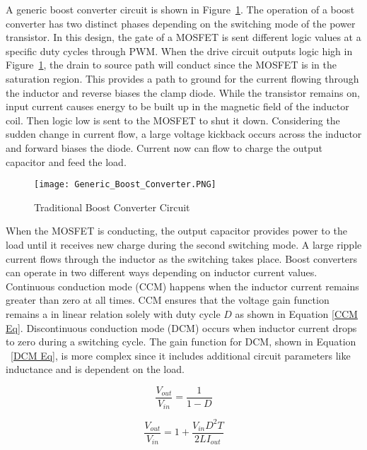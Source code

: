 A generic boost converter circuit is shown in Figure~\ref{genericBoost}. The operation of a boost converter has two distinct phases depending on the switching mode of the power transistor. In this design, the gate of a MOSFET is sent different logic values at a specific duty cycles through PWM. When the drive circuit outputs logic high in Figure~\ref{genericBoost}, the drain to source path will conduct since the MOSFET is in the saturation region. This provides a path to ground for the current flowing through the inductor and reverse biases the clamp diode. While the transistor remains on, input current causes energy to be built up in the magnetic field of the inductor coil. Then logic low is sent to the MOSFET to shut it down. Considering the sudden change in current flow, a large voltage kickback occurs across the inductor and forward biases the diode. Current now can flow to charge the output capacitor and feed the load.

\begin{figure}
\centering
\texttt{[image: Generic\_Boost\_Converter.PNG]}
\caption{Traditional Boost Converter Circuit}
\label{genericBoost}
\end{figure}

When the MOSFET is conducting, the output capacitor provides power to the load until it receives new charge during the second switching mode. A large ripple current flows through the inductor as the switching takes place. Boost converters can operate in two different ways depending on inductor current values. Continuous conduction mode (CCM) happens when the inductor current remains greater than zero at all times. CCM ensures that the voltage gain function remains a in linear relation solely with duty cycle $D$ as shown in Equation \ref{CCM Eq}. Discontinuous conduction mode (DCM) occurs when inductor current drops to zero during a switching cycle. The gain function for DCM, shown in Equation ~\ref{DCM Eq}, is more complex since it includes additional circuit parameters like inductance and is dependent on the load. 

\begin{equation}
\frac{V_{out}}{V_{in}} =  \frac{1}{1-D}
\label{CCM Eq}
\end{equation}   

\begin{equation}
\frac{V_{out}}{V_{in}} = 1 + \frac{V_{in}D^2T}{2LI_{out}}
\label{DCM Eq}
\end{equation}

